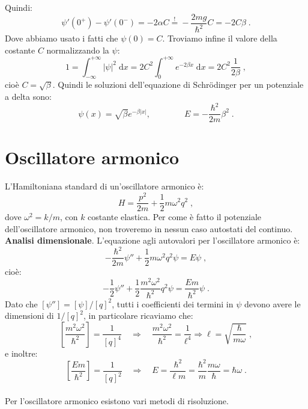 \documentclass[10pt,a4paper]{report}
\theoremstyle{definition}
\numberwithin{equation}{section}
\newcommand{\diff}[1][]{\mathrm{d}#1}
\newcommand{\Sch}{Schrödinger}
\begin{document}
Quindi:
$$
\psi'(0^+)-\psi'(0^-)=-2\alpha C\stackrel{!}{=}-\frac{2mg}{\hbar^2}C=-2C\beta\;.
$$
Dove abbiamo usato i fatti che $\psi(0)=C$. Troviamo infine il valore della costante $C$ normalizzando la $\psi$:
\begin{equation}
1=\int_{-\infty}^{+\infty}|\psi|^2\;\diff{x}=2C^2\int_0^{+\infty}e^{-2\beta x}\;\diff{x}=2C^2\frac{1}{2\beta}\;,
\end{equation}
cioè $C=\sqrt{\beta}$. Quindi le soluzioni dell'equazione di \Sch\; per un potenziale a delta sono:
\begin{equation}
\psi(x)=\sqrt{\beta}e^{-\beta|x|},\qquad\qquad E=-\frac{\hbar^2}{2m}\beta^2\;.
\end{equation}
\chapter{Oscillatore armonico}
L'Hamiltoniana standard di un'oscillatore armonico è:
\begin{equation}
H=\frac{p^2}{2m}+\frac{1}{2}m\omega^2q^2\;, \label{ch4_harmonicham}
\end{equation}
dove $\omega^2=k/m$, con $k$ costante elastica. Per come è fatto il potenziale dell'oscillatore armonico, non troveremo in nessun caso autostati del continuo. \\
\textbf{Analisi dimensionale}. L'equazione agli autovalori per l'oscillatore armonico è:
\begin{equation}
-\frac{\hbar^2}{2m}\psi''+\frac{1}{2}m\omega^2q^2\psi=E\psi\;,
\end{equation}
cioè:
$$
-\frac{1}{2}\psi''+\frac{1}{2}\frac{m^2\omega^2}{\hbar^2}q^2\psi=\frac{Em}{\hbar^2}\psi\;.
$$
Dato che $[\psi'']=[\psi]/[q]^2$, tutti i coefficienti dei termini in $\psi$ devono avere le dimensioni di $1/[q]^2$, in particolare ricaviamo che:
\begin{equation}
\left[\frac{m^2\omega^2}{\hbar^2}\right]=\frac{1}{[q]^4}\quad \Longrightarrow\quad \frac{m^2\omega^2}{\hbar^2}=\frac{1}{\ell^4}
\Longrightarrow \ell=\sqrt{\frac{\hbar}{m\omega}}\;,
\end{equation}
e inoltre:
\begin{equation}
\left[\frac{Em}{\hbar^2}\right]=\frac{1}{[q]^2}\quad \Longrightarrow\quad E=\frac{\hbar^2}{\ell m}=\frac{\hbar^2}{m}\frac{m\omega}{\hbar}=\hbar\omega\;.
\end{equation}
\\
Per l'oscillatore armonico esistono vari metodi di risoluzione.
\end{document}
